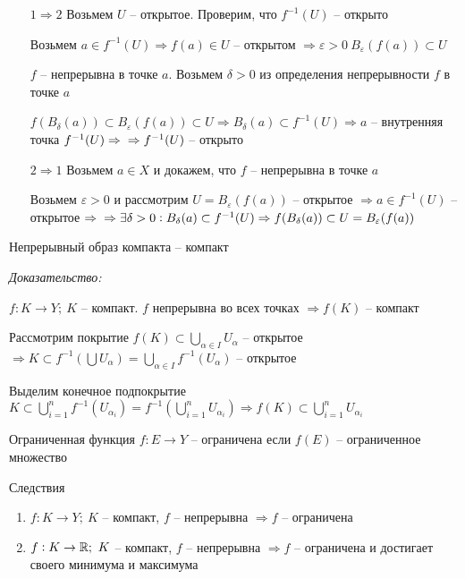 \documentclass[12pt]{article}
\begin{document}
\begin{itemize}
    \item[$1 \Rightarrow 2$] Возьмем $U$ -- открытое. Проверим, что $f^{-1}(U)$ -- открыто 
    
    Возьмем $a \in f^{-1}(U) \Rightarrow f(a) \in U$ -- открытом $\Rightarrow \varepsilon > 0\ B_\varepsilon(f(a)) \subset U$

    $f$ -- непрерывна в точке $a$. Возьмем $\delta > 0$ из определения непрерывности $f$ в точке $a$

    $f(B_\delta(a)) \subset B_\varepsilon(f(a)) \subset U \Rightarrow B_\delta(a) \subset f^{-1}(U) \Rightarrow a$ -- внутренняя точка $f^{-1}(U) \Rightarrow \\
    \Rightarrow f^{-1}(U)$ -- открыто

    \item[$2 \Rightarrow 1$] Возьмем $a \in X$ и докажем, что $f$ -- непрерывна в точке $a$
    
    Возьмем $\varepsilon > 0$ и рассмотрим $U = B_\varepsilon(f(a))$ -- открытое $\Rightarrow a \in f^{-1}(U)$ -- открытое $\Rightarrow \\
    \Rightarrow \exists \delta > 0 : B_\delta(a) \subset f^{-1}(U) \Rightarrow f(B_\delta(a)) \subset U = B_\varepsilon(f(a))$
\end{itemize}

\begin{theo}{}
    Непрерывный образ компакта -- компакт
\end{theo}

\textit{Доказательство:}

$f : K \to Y;\ K$ -- компакт. $f$ непрерывна во всех точках $\Rightarrow f(K)$ -- компакт

Рассмотрим покрытие $f(K) \subset \bigcup\limits_{\alpha \in I} U_\alpha$ -- открытое $\Rightarrow K \subset f^{-1}(\bigcup U_\alpha) = \bigcup\limits_{\alpha \in I} f^{-1}(U_\alpha)$ -- открытое

Выделим конечное подпокрытие $K \subset \bigcup\limits_{i = 1}^n f^{-1}(U_{\alpha_i}) = f^{-1}(\bigcup\limits_{i = 1}^n U_{\alpha_i}) \Rightarrow f(K) \subset \bigcup\limits_{i = 1}^n U_{\alpha_i}$

\begin{defin}{Ограниченная функция}
    $f: E \to Y$ -- ограничена если $f(E)$ -- ограниченное множество
\end{defin}

\begin{theo}{Следствия}
    \begin{enumerate}
        \item $f : K \to Y;\ K$ -- компакт, $f$ -- непрерывна $\Rightarrow f$ -- ограничена
        \item $f : K \to \mathbb R;\ K$ -- компакт, $f$ -- непрерывна $\Rightarrow f$ -- ограничена и достигает своего минимума и максимума
    \end{enumerate}
\end{theo}
\end{document}
